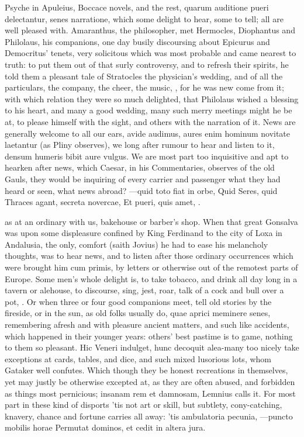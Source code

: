 {Psyche in Apuleius, Boccace novels, and the rest, quarum
auditione pueri delectantur, senes narratione, which some delight to
hear, some to tell; all are well pleased with. Amaranthus, the
philosopher, met Hermocles, Diophantus and Philolaus, his companions,
one day busily discoursing about Epicurus and Democritus' tenets, very
solicitous which was most probable and came nearest to truth: to put
them out of that surly controversy, and to refresh their spirits, he
told them a pleasant tale of Stratocles the physician's wedding, and of
all the particulars, the company, the cheer, the music, \etc{}, for he was
new come from it; with which relation they were so much delighted, that
Philolaus wished a blessing to his heart, and many a good
wedding, many such merry meetings might he be at, to please
himself with the sight, and others with the narration of it. News are
generally welcome to all our ears, avide audimus, aures enim hominum
novitate laetantur (as Pliny observes), we long after rumour to
hear and listen to it, densum humeris bibit aure vulgus. We are
most part too inquisitive and apt to hearken after news, which Caesar,
in his Commentaries, observes of the old Gauls, they would be
inquiring of every carrier and passenger what they had heard or seen,
what news abroad?
---quid toto fiat in orbe,
Quid Seres, quid Thraces agant, secreta novercae,
Et pueri, quis amet, \etc{}.

as at an ordinary with us, bakehouse or barber's shop. When that great
Gonsalva was upon some displeasure confined by King Ferdinand to the
city of Loxa in Andalusia, the only, comfort (saith Jovius) he
had to ease his melancholy thoughts, was to hear news, and to listen
after those ordinary occurrences which were brought him cum primis, by
letters or otherwise out of the remotest parts of Europe. Some men's
whole delight is, to take tobacco, and drink all day long in a tavern
or alehouse, to discourse, sing, jest, roar, talk of a cock and bull
over a pot, \etc{}. Or when three or four good companions meet, tell old
stories by the fireside, or in the sun, as old folks usually do, quae
aprici meminere senes, remembering afresh and with pleasure ancient
matters, and such like accidents, which happened in their younger
years: others' best pastime is to game, nothing to them so pleasant.
Hic Veneri indulget, hunc decoquit alea-many too nicely take
exceptions at cards, tables, and dice, and such mixed lusorious
lots, whom Gataker well confutes. Which though they be honest
recreations in themselves, yet may justly be otherwise excepted at, as
they are often abused, and forbidden as things most pernicious; insanam
rem et damnosam, Lemnius calls it. For most part in these kind of
disports 'tis not art or skill, but subtlety, cony-catching, knavery,
chance and fortune carries all away: 'tis ambulatoria pecunia,
---puncto mobilis horae
Permutat dominos, et cedit in altera jura.

}
